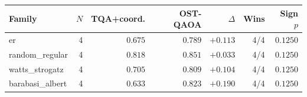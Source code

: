 \begin{tabular}{lrrrrrr}
\toprule
Family & $N$ & TQA+coord. & OST-QAOA & $\Delta$ & Wins & Sign $p$ \\
\midrule
er & 4 & $0.675$ & $0.789$ & $+0.113$ & 4/4 & $0.1250$ \\
random\_regular & 4 & $0.818$ & $0.851$ & $+0.033$ & 4/4 & $0.1250$ \\
watts\_strogatz & 4 & $0.705$ & $0.809$ & $+0.104$ & 4/4 & $0.1250$ \\
barabasi\_albert & 4 & $0.633$ & $0.823$ & $+0.190$ & 4/4 & $0.1250$ \\
\bottomrule
\end{tabular}
